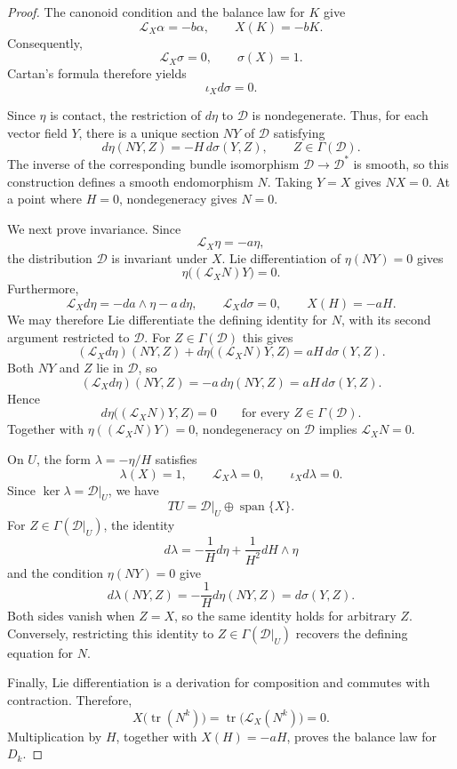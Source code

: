 \documentclass[11pt,a4paper]{article}
\numberwithin{equation}{section}
\theoremstyle{definition}
\theoremstyle{remark}
\begin{document}
\begin{proof}
The canonoid condition and the balance law for $K$ give
\[
\mathcal L_X\alpha=-b\alpha,
\qquad
X(K)=-bK.
\]
Consequently,
\[
\mathcal L_X\sigma=0,
\qquad
\sigma(X)=1.
\]
Cartan's formula therefore yields
\[
\iota_Xd\sigma=0.
\]

Since $\eta$ is contact, the restriction of $d\eta$ to
$\mathcal D$ is nondegenerate. Thus, for each vector field $Y$,
there is a unique section $NY$ of $\mathcal D$ satisfying
\[
d\eta(NY,Z)=-H\,d\sigma(Y,Z),
\qquad Z\in\Gamma(\mathcal D).
\]
The inverse of the corresponding bundle isomorphism
$\mathcal D\to\mathcal D^*$ is smooth, so this construction
defines a smooth endomorphism $N$. Taking $Y=X$ gives $NX=0$.
At a point where $H=0$, nondegeneracy gives $N=0$.

We next prove invariance. Since
\[
\mathcal L_X\eta=-a\eta,
\]
the distribution $\mathcal D$ is invariant under $X$.
Lie differentiation of $\eta(NY)=0$ gives
\[
\eta\bigl((\mathcal L_XN)Y\bigr)=0.
\]
Furthermore,
\[
\mathcal L_Xd\eta=-da\wedge\eta-a\,d\eta,
\qquad
\mathcal L_Xd\sigma=0,
\qquad
X(H)=-aH.
\]
We may therefore Lie differentiate the defining identity for
$N$, with its second argument restricted to $\mathcal D$.
For $Z\in\Gamma(\mathcal D)$ this gives
\[
(\mathcal L_Xd\eta)(NY,Z)
+d\eta\bigl((\mathcal L_XN)Y,Z\bigr)
=aH\,d\sigma(Y,Z).
\]
Both $NY$ and $Z$ lie in $\mathcal D$, so
\[
(\mathcal L_Xd\eta)(NY,Z)
=-a\,d\eta(NY,Z)
=aH\,d\sigma(Y,Z).
\]
Hence
\[
d\eta\bigl((\mathcal L_XN)Y,Z\bigr)=0
\qquad\text{for every }Z\in\Gamma(\mathcal D).
\]
Together with
$\eta((\mathcal L_XN)Y)=0$, nondegeneracy on $\mathcal D$
implies $\mathcal L_XN=0$.

On $U$, the form $\lambda=-\eta/H$ satisfies
\[
\lambda(X)=1,\qquad
\mathcal L_X\lambda=0,\qquad
\iota_Xd\lambda=0.
\]
Since $\ker\lambda=\mathcal D|_U$, we have
\[
TU=\mathcal D|_U\oplus\operatorname{span}\{X\}.
\]
For $Z\in\Gamma(\mathcal D|_U)$, the identity
\[
d\lambda=-\frac{1}{H}d\eta
+\frac{1}{H^2}dH\wedge\eta
\]
and the condition $\eta(NY)=0$ give
\[
d\lambda(NY,Z)
=-\frac{1}{H}d\eta(NY,Z)
=d\sigma(Y,Z).
\]
Both sides vanish when $Z=X$, so the same identity holds
for arbitrary $Z$. Conversely, restricting this identity
to $Z\in\Gamma(\mathcal D|_U)$ recovers the defining
equation for $N$.

Finally, Lie differentiation is a derivation for composition
and commutes with contraction. Therefore,
\[
X\bigl(\operatorname{tr}(N^k)\bigr)
=\operatorname{tr}\bigl(\mathcal L_X(N^k)\bigr)=0.
\]
Multiplication by $H$, together with $X(H)=-aH$, proves
the balance law for $D_k$.
\end{proof}
\end{document}
